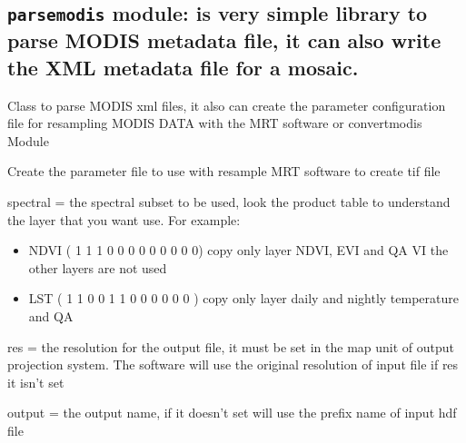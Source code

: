 \documentclass[a4paper,11pt,oneside]{sphinxmanual}
\begin{document}
\subsection{\texttt{parsemodis} module: is very simple library to parse MODIS metadata file, it can also write the XML metadata file for a mosaic.}
\label{pymodis/pymodis:parsemodis-module-is-very-simple-library-to-parse-modis-metadata-file-it-can-also-write-the-xml-metadata-file-for-a-mosaic}\label{pymodis/pymodis:module-pymodis.parsemodis}

\begin{fulllineitems}
\label{pymodis/pymodis:pymodis.parsemodis.parseModis}
Class to parse MODIS xml files, it also can create the parameter
configuration file for resampling MODIS DATA with the MRT software or
convertmodis Module

\begin{fulllineitems}
\label{pymodis/pymodis:pymodis.parsemodis.parseModis.confResample}
Create the parameter file to use with resample MRT software to create
tif file

spectral = the spectral subset to be used, look the product table to
understand the layer that you want use. For example:
\begin{itemize}
\item {} 
NDVI ( 1 1 1 0 0 0 0 0 0 0 0 0) copy only layer NDVI, EVI
and QA VI the other layers are not used

\item {} 
LST ( 1 1 0 0 1 1 0 0 0 0 0 0 ) copy only layer daily and
nightly temperature and QA

\end{itemize}

res = the resolution for the output file, it must be set in the map
unit of output projection system. The software will use the
original resolution of input file if res it isn't set

output = the output name, if it doesn't set will use the prefix name
of input hdf file


\end{fulllineitems}
\end{fulllineitems}
\end{document}
